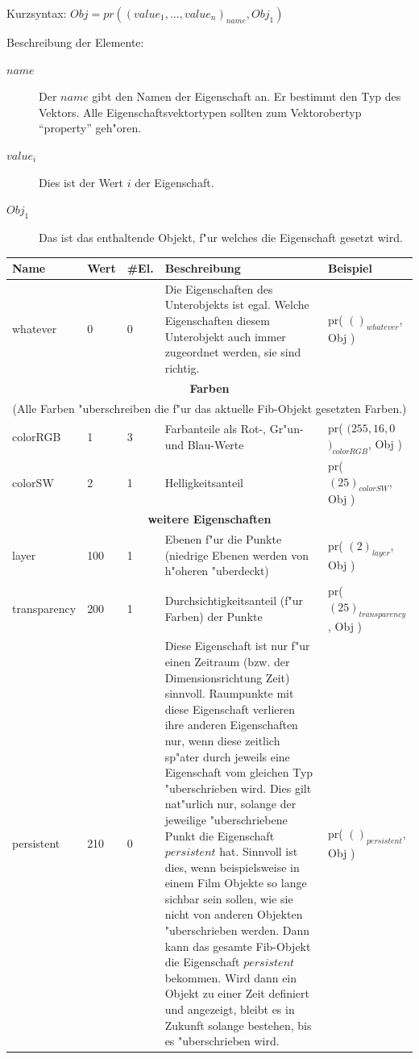 \bigskip\noindent
Kurzsyntax:
$Obj = pr( (value_1, ..., value_n)_{name}, Obj_1 )$

\bigskip\noindent
Beschreibung der Elemente:
\begin{description}
 \item[$name$] Der $name$ gibt den Namen der Eigenschaft an. Er bestimmt den Typ des Vektors. Alle Eigenschaftsvektortypen sollten zum Vektorobertyp ``property'' geh"oren.
 \item[$value_i$] Dies ist der Wert $i$ der Eigenschaft.
 \item[$Obj_1$] Das ist das enthaltende Objekt, f"ur welches die Eigenschaft gesetzt wird.
\end{description}


\begin{small}
\begin{center}
\begin{longtable}{|p{22mm}|p{6mm}|p{5mm}|p{50mm}|p{30mm}|}\hline
	\textbf{Name} & \textbf{Wert} & \textbf{\#El.} & \textbf{Beschreibung} & \textbf{Beispiel} \\\hline\endhead
	whatever & 0 & 0 & Die Eigenschaften des Unterobjekts ist egal. Welche Eigenschaften diesem Unterobjekt auch immer zugeordnet werden, sie sind richtig. & pr( $()_{whatever}$, Obj )\\\hline
	\multicolumn{5}{|c|}{\textbf{Farben}}\\
	\multicolumn{5}{|c|}{(Alle Farben "uberschreiben die f"ur das aktuelle Fib-Objekt gesetzten Farben.)}\\\hline
	colorRGB & 1 & 3 & Farbanteile als Rot-, Gr"un- und Blau-Werte & pr( $(255, 16, 0$ $)_{colorRGB}$, Obj )\\\hline
	colorSW & 2 & 1 & Helligkeitsanteil & pr( $(25)_{colorSW}$, Obj )\\\hline

	\multicolumn{5}{|c|}{\textbf{weitere Eigenschaften}}\\\hline
	layer & 100 & 1 & Ebenen f"ur die Punkte (niedrige Ebenen werden von h"oheren "uberdeckt) & pr( $(2)_{layer}$, Obj )\\\hline
	transparency & 200 & 1 & Durchsichtigkeitsanteil (f"ur Farben) der Punkte & pr( $(25)_{transparency}$, Obj ) \\\hline
	persistent & 210 & 0 & Diese Eigenschaft ist nur f"ur einen Zeitraum (bzw. der Dimensionsrichtung Zeit) sinnvoll. Raumpunkte mit diese Eigenschaft verlieren ihre anderen Eigenschaften nur, wenn diese zeitlich sp"ater durch jeweils eine Eigenschaft vom gleichen Typ "uberschrieben wird. Dies gilt nat"urlich nur, solange der jeweilige "uberschriebene Punkt die Eigenschaft $persistent$ hat. Sinnvoll ist dies, wenn beispielsweise in einem Film Objekte so lange sichbar sein sollen, wie sie nicht von anderen Objekten "uberschrieben werden. Dann kann das gesamte Fib-Objekt die Eigenschaft $persistent$ bekommen. Wird dann ein Objekt zu einer Zeit definiert und angezeigt, bleibt es in Zukunft solange bestehen, bis es "uberschrieben wird. &  pr( $()_{persistent}$, Obj ) \\\hline


\end{longtable}
\end{center}
\end{small}
